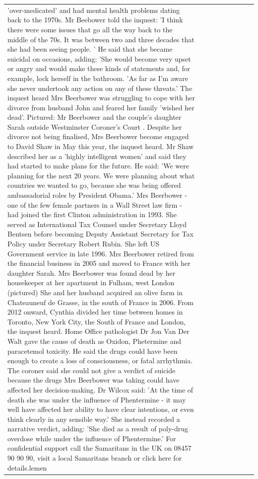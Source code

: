 \begin{table}[H]
\begin{tabular}{lllrlllll}
'over-medicated' and had mental health problems dating back to the 1970s. Mr Beebower told the inquest: 'I think there were some issues that go all the way back to the middle of the 70s. It was between two and three decades that she had been seeing people. ' He said that she became suicidal on occasions, adding: 'She would become very upset or angry and would make these kinds of statements and, for example, lock herself in the bathroom. 'As far as I'm aware she never undertook any action on any of these threats.' The inquest heard Mrs Beerbower was struggling to cope with her divorce from husband John and feared her family 'wished her dead'. Pictured: Mr Beerbower and the couple's daughter Sarah outside Westminster Coroner's Court . Despite her divorce not being finalised, Mrs Beerbower become engaged to David Shaw in May this year, the inquest heard. Mr Shaw described her as a 'highly intelligent women' and said they had started to make plans for the future. He said: 'We were planning for the next 20 years. We were planning about what countries we wanted to go, because she was being offered ambassadorial roles by President Obama.' Mrs Beerbower - one of the few female partners in a Wall Street law firm - had joined the first Clinton administration in 1993. She served as International Tax Counsel under Secretary Lloyd Bentsen before becoming Deputy Assistant Secretary for Tax Policy under Secretary Robert Rubin. She left US Government service in late 1996. Mrs Beerbower retired from the financial business in 2005 and moved to France with her daughter Sarah. Mrs Beerbower was found dead by her housekeeper at her apartment in Fulham, west London (pictured) She and her husband acquired an olive farm in Chateauneuf de Grasse, in the south of France in 2006. From 2012 onward, Cynthia divided her time between homes in Toronto, New York City, the South of France and London, the inquest heard. Home Office pathologist Dr Jon Van Der Walt gave the cause of death as Oxidon, Phetermine and paracetemol toxicity. He said the drugs could have been enough to create a loss of consciousness, or fatal arrhythmia. The coroner said she could not give a verdict of suicide because the drugs Mrs Beerbower was taking could have affected her decision-making. Dr Wilcox said: 'At the time of death she was under the influence of Phentermine - it may well have affected her ability to have clear intentions, or even think clearly in any sensible way.' She instead recorded a narrative verdict, adding: 'She died as a result of poly-drug overdose while under the influence of Phentermine.' For confidential support call the Samaritans in the UK on 08457 90 90 90, visit a local Samaritans branch or click here for details.lemen \\

\end{tabular}
\end{table}
